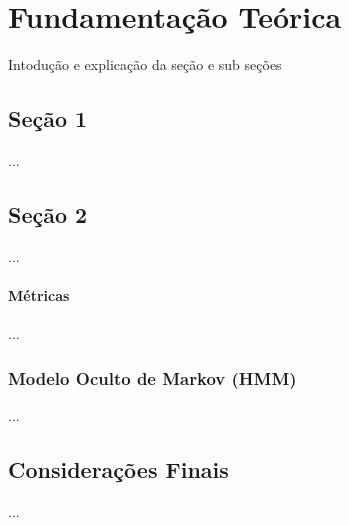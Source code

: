 \chapter{Fundamentação Teórica}\label{chap:fundamentacao}

Intodução e explicação da seção e sub seções

\section{Seção 1}\label{sec:libras}

...

\section{Seção 2}\label{sec:amc}

... 

\subsubsection*{Métricas}

...

\subsection{Modelo Oculto de Markov (HMM)}\label{sec:hmm}

...

\section{Considerações Finais}\label{chap:fundamentacao:consideracao}

...